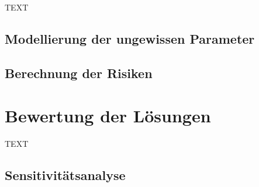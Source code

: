 TEXT

	\subsection*{Modellierung der ungewissen Parameter}
	

	\subsection*{Berechnung der Risiken}
	



\section{Bewertung der Lösungen}
\label{sec:Bewertung}

TEXT

	\subsection*{Sensitivitätsanalyse}
	

%

